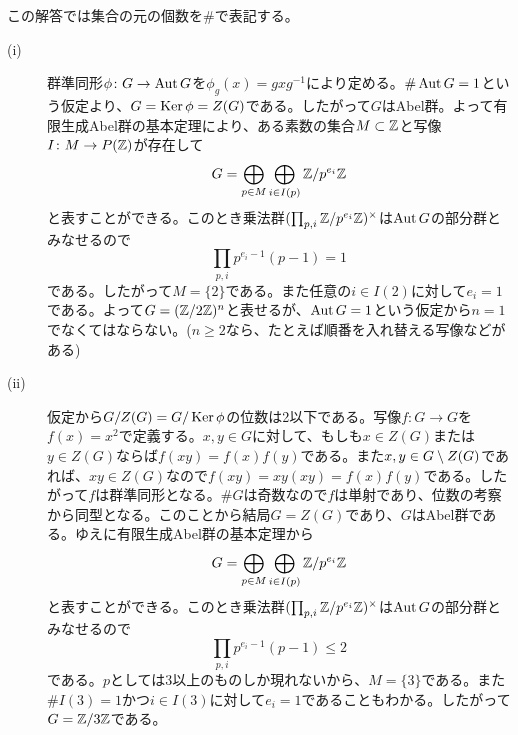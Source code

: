 

\begin{sol} この解答では集合の元の個数を$\#$で表記する。
   \begin{description}
     \item[(i)] 群準同形$\phi \colon G \to \operatorname{Aut} G$を$\phi_g(x)=gxg^{-1}$により定める。$\# \operatorname{Aut} G = 1$という仮定より、$G = \operatorname{Ker} \phi = Z(G)$である。したがって$G$はAbel群。よって有限生成Abel群の基本定理により、ある素数の集合$M \subset {\mathbb Z}$と写像$I \colon M \to P({\mathbb Z})$が存在して
     \[
     G = \bigoplus_{p \in M} \bigoplus_{i \in I(p)} {\mathbb Z} / p^{e_i} {\mathbb Z}
     \]
     と表すことができる。このとき乗法群$(\prod_{p, i } {\mathbb Z} / p^{e_i} {\mathbb Z})^{\times}$は$\operatorname{Aut} G$の部分群とみなせるので
     \[
     \prod_{p, i} p^{e_i - 1}(p -1) = 1
     \]
     である。したがって$M=\{ 2 \}$である。また任意の$i \in I(2)$に対して$e_i = 1$である。よって$G = ({\mathbb Z} / 2 {\mathbb Z})^n$と表せるが、$\operatorname{Aut} G = 1$という仮定から$n=1$でなくてはならない。($n \geq 2$なら、たとえば順番を入れ替える写像などがある)
     \item[(ii)] 仮定から$G/ Z(G) = G/ \operatorname{Ker} \phi $の位数は2以下である。写像$f \colon G \to G$を$f(x) = x^2$で定義する。$x,y \in G$に対して、もしも$x \in Z(G)$または$y \in Z(G)$ならば$f(xy)=f(x)f(y)$である。また$x , y \in G \setminus Z(G)$であれば、$xy \in Z(G)$なので$f(xy)=xy(xy) =f(x)f(y)$である。したがって$f$は群準同形となる。$\# G$は奇数なので$f$は単射であり、位数の考察から同型となる。このことから結局$G= Z(G)$であり、$G$はAbel群である。ゆえに有限生成Abel群の基本定理から
     \[
        G = \bigoplus_{p \in M} \bigoplus_{i \in I(p)} {\mathbb Z} / p^{e_i} {\mathbb Z}
     \]
     と表すことができる。このとき乗法群$(\prod_{p, i } {\mathbb Z} / p^{e_i} {\mathbb Z})^{\times}$は$\operatorname{Aut} G$の部分群とみなせるので
     \[
     \prod_{p, i} p^{e_i - 1}(p -1) \leq 2
     \]
     である。$p$としては$3$以上のものしか現れないから、$M = \{ 3 \}$である。また$\# I(3) =1$かつ$i \in I(3)$に対して$e_i = 1$であることもわかる。したがって$G = {\mathbb Z} / 3{\mathbb Z}$である。
   \end{description}
\end{sol}

